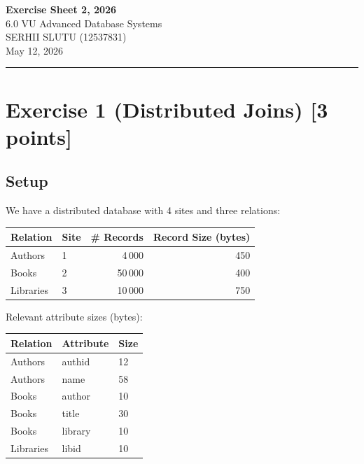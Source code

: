 \documentclass[a4paper,11pt]{article}
\begin{document}

\begin{center}
  {\LARGE\bfseries Exercise Sheet 2, 2026}\\[0.5em]
  {\large 6.0 VU Advanced Database Systems}\\[0.3em]
  {\large SERHII SLUTU (12537831)}\\[0.3em]
  {\large May 12, 2026}
\end{center}

\vspace{0.4em}\hrule\vspace{1em}

\section*{Exercise 1 (Distributed Joins) [3 points]}

\subsection*{Setup}

We have a distributed database with 4 sites and three relations:

\begin{center}
\begin{tabular}{llrr}
\toprule
\textbf{Relation} & \textbf{Site} & \textbf{\# Records} & \textbf{Record Size (bytes)} \\
\midrule
Authors    & 1 & 4\,000  & 450 \\
Books      & 2 & 50\,000 & 400 \\
Libraries  & 3 & 10\,000 & 750 \\
\bottomrule
\end{tabular}
\end{center}

Relevant attribute sizes (bytes):

\begin{center}
\begin{tabular}{lll}
\toprule
\textbf{Relation} & \textbf{Attribute} & \textbf{Size} \\
\midrule
Authors   & authid  & 12 \\
Authors   & name    & 58 \\
Books     & author  & 10 \\
Books     & title   & 30 \\
Books     & library & 10 \\
Libraries & libid   & 10 \\
\bottomrule
\end{tabular}
\end{center}
\end{document}
